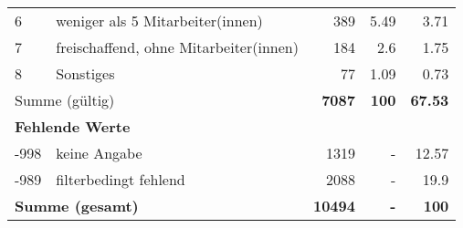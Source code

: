 \begin{longtable}{lXrrr}
     6 &
     \multicolumn{1}{X}{ weniger als 5 Mitarbeiter(innen)   } &


       \num{389} &
       \num[round-mode=places,round-precision=2]{5.49} &
         \num[round-mode=places,round-precision=2]{3.71} \\

     7 &
     \multicolumn{1}{X}{ freischaffend, ohne Mitarbeiter(innen)   } &


       \num{184} &
       \num[round-mode=places,round-precision=2]{2.6} &
         \num[round-mode=places,round-precision=2]{1.75} \\

     8 &
     \multicolumn{1}{X}{ Sonstiges   } &


       \num{77} &
       \num[round-mode=places,round-precision=2]{1.09} &
         \num[round-mode=places,round-precision=2]{0.73} \\
     \midrule
     \multicolumn{2}{l}{Summe (gültig)} &
       \textbf{\num{7087}} &
     \textbf{\num{100}} &
       \textbf{\num[round-mode=places,round-precision=2]{67.53}} \\
     \multicolumn{5}{l}{\textbf{Fehlende Werte}}\\
       -998 &
       keine Angabe &
         \num{1319} &
        - &
         \num[round-mode=places,round-precision=2]{12.57} \\
       -989 &
       filterbedingt fehlend &
         \num{2088} &
        - &
         \num[round-mode=places,round-precision=2]{19.9} \\
     \midrule
     \multicolumn{2}{l}{\textbf{Summe (gesamt)}} &
          \textbf{\num{10494}} &
        \textbf{-} &
        \textbf{\num{100}} \\
     \bottomrule
     \end{longtable}
     
